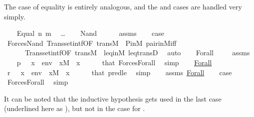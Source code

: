 The case of equality is entirely analogous, and the  and
 cases are handled very simply.
%
\begin{isabelle}
\isamarkupfalse%
\isanewline
\ \ \isamarkupfalse%
\ {\isacharparenleft}Equal\ n\ m{\isacharparenright}\isanewline
\ \ \dots\isanewline
{}\isamarkupfalse%
\isanewline
\ \ \isamarkupfalse%
\ {\isacharparenleft}Nand\ {\isasymphi}\ {\isasympsi}{\isacharparenright}\isanewline
\ \ \isamarkupfalse%
\ assms\isanewline
\ \ \isamarkupfalse%
\ {\isacharquery}case\ \isanewline
\ \ \ \ \isamarkupfalse%
\ Forces{\isacharunderscore}Nand\ Transset{\isacharunderscore}intf{\isacharbrackleft}OF\ trans{\isacharunderscore}M\ {\isacharunderscore}\ P{\isacharunderscore}in{\isacharunderscore}M{\isacharbrackright}\ pair{\isacharunderscore}in{\isacharunderscore}M{\isacharunderscore}iff\isanewline
\ \ \ \ \ \ Transset{\isacharunderscore}intf{\isacharbrackleft}OF\ trans{\isacharunderscore}M\ {\isacharunderscore}\ leq{\isacharunderscore}in{\isacharunderscore}M{\isacharbrackright}\ leq{\isacharunderscore}transD\ \isamarkupfalse%
\ auto\isanewline
{}\isamarkupfalse%
\isanewline
\ \ \isamarkupfalse%
\ {\isacharparenleft}Forall\ {\isasymphi}{\isacharparenright}\isanewline
\ \ \isamarkupfalse%
\ assms\isanewline
\ \ \isamarkupfalse%
\ {\isachardoublequoteopen}p\ {\isasymtturnstile}\ {\isasymphi}\ {\isacharparenleft}{\isacharbrackleft}x{\isacharbrackright}\ {\isacharat}\ env{\isacharparenright}{\isachardoublequoteclose}\ \ {\isachardoublequoteopen}x{\isasymin}M{\isachardoublequoteclose}\ \ x\isanewline
\ \ \ \ \isamarkupfalse%
\ that\ Forces{\isacharunderscore}Forall\ \isamarkupfalse%
\ simp\isanewline
\ \ \isamarkupfalse%
\ \underline{Forall}\ \isanewline
\ \ \isamarkupfalse%
\ {\isachardoublequoteopen}r\ {\isasymtturnstile}\ {\isasymphi}\ {\isacharparenleft}{\isacharbrackleft}x{\isacharbrackright}\ {\isacharat}\ env{\isacharparenright}{\isachardoublequoteclose}\ \ {\isachardoublequoteopen}x{\isasymin}M{\isachardoublequoteclose}\ \ x\isanewline
\ \ \ \ \isamarkupfalse%
\ that\ pred{\isacharunderscore}le{}\ \isamarkupfalse%
\ {\isacharparenleft}simp{\isacharparenright}\isanewline
\ \ \isamarkupfalse%
\ assms\ \underline{Forall}\isanewline
\ \ \isamarkupfalse%
\ {\isacharquery}case\ \isanewline
\ \ \ \ \isamarkupfalse%
\ Forces{\isacharunderscore}Forall\ \isamarkupfalse%
\ simp\isanewline
{}\isamarkupfalse
\end{isabelle}
%
It can be noted that the inductive hypothesis
gets used in the last case (underlined here as
), but not in the case for .



